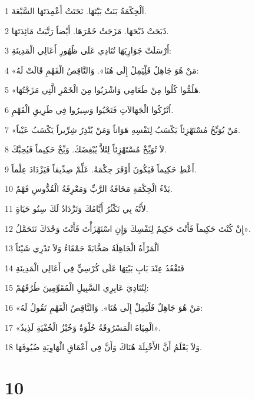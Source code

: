 \par 1 اَلْحِكْمَةُ بَنَتْ بَيْتَهَا. نَحَتَتْ أَعْمِدَتَهَا السَّبْعَةَ.
\par 2 ذَبَحَتْ ذَبْحَهَا. مَزَجَتْ خَمْرَهَا. أَيْضاً رَتَّبَتْ مَائِدَتَهَا.
\par 3 أَرْسَلَتْ جَوَارِيَهَا تُنَادِي عَلَى ظُهُورِ أَعَالِي الْمَدِينَةِ:
\par 4 «مَنْ هُوَ جَاهِلٌ فَلِْيَمِلْ إِلَى هُنَا». وَالنَّاقِصُ الْفَهْمِ قَالَتْ لَهُ:
\par 5 «هَلُمُّوا كُلُوا مِنْ طَعَامِي وَاشْرَبُوا مِنَ الْخَمْرِ الَّتِي مَزَجْتُهَا.
\par 6 اُتْرُكُوا الْجَهَالاَتِ فَتَحْيُوا وَسِيرُوا فِي طَرِيقِ الْفَهْمِ.
\par 7 «مَنْ يُوَبِّخُ مُسْتَهْزِئاً يَكْسَبُ لِنَفْسِهِ هَوَاناً وَمَنْ يُنْذِرُ شِرِّيراً يَكْسَبُ عَيْباً.
\par 8 لاَ تُوَبِّخْ مُسْتَهْزِئاً لِئَلاَّ يُبْغِضَكَ. وَبِّخْ حَكِيماً فَيُحِبَّكَ.
\par 9 أَعْطِ حَكِيماً فَيَكُونَ أَوْفَرَ حِكْمَةً. عَلِّمْ صِدِّيقاً فَيَزْدَادَ عِلْماً.
\par 10 بَدْءُ الْحِكْمَةِ مَخَافَةُ الرَّبِّ وَمَعْرِفَةُ الْقُدُّوسِ فَهْمٌ.
\par 11 لأَنَّهُ بِي تَكْثُرُ أَيَّامُكَ وَتَزْدَادُ لَكَ سِنُو حَيَاةٍ.
\par 12 إِنْ كُنْتَ حَكِيماً فَأَنْتَ حَكِيمٌ لِنَفْسِكَ وَإِنِ اسْتَهْزَأْتَ فَأَنْتَ وَحْدَكَ تَتَحَمَّلُ».
\par 13 اَلْمَرْأَةُ الْجَاهِلَةُ صَخَّابَةٌ حَمْقَاءُ وَلاَ تَدْرِي شَيْئاً
\par 14 فَتَقْعُدُ عِنْدَ بَابِ بَيْتِهَا عَلَى كُرْسِيٍّ فِي أَعَالِي الْمَدِينَةِ
\par 15 لِتُنَادِيَ عَابِرِي السَّبِيلِ الْمُقَوِّمِينَ طُرُقَهُمْ:
\par 16 «مَنْ هُوَ جَاهِلٌ فَلْيَمِلْ إِلَى هُنَا». وَالنَّاقِصُ الْفَهْمِ تَقُولُ لَهُ:
\par 17 «الْمِيَاهُ الْمَسْرُوقَةُ حُلْوَةٌ وَخُبْزُ الْخُفْيَةِ لَذِيذٌ».
\par 18 وَلاَ يَعْلَمُ أَنَّ الأَخْيِلَةَ هُنَاكَ وَأَنَّ فِي أَعْمَاقِ الْهَاوِيَةِ ضُيُوفَهَا.

\chapter{10}

